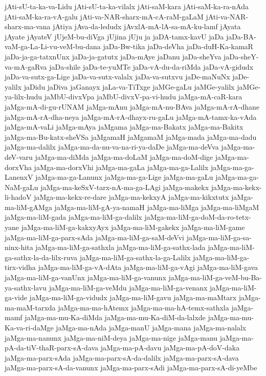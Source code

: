 {jAti-sU-ta-ka-va-Lidu
jAti-sU-ta-ka-vilalx
jAti-saM-kara
jAti-saM-ka-ra-nAda
jAti-saM-ka-ra-vA-galu
jAti-va-NAR-sharx-mA-cA-raM-gaLaM
jAti-va-NAR-sharx-ma-vana
jAtiya
jAva-da-ledudx
jAvxlA-mA-lA-sa-mA-ku-lamf
jAyata
jAyate
jAyateV
jUjeM-bu-diVga
jUjina
jUju
ja
jaDA-tamx-kavU
jaDa
jaDa-BA-vaM-ga-La-Li-vu-veM-bu-dana
jaDa-Bw-tika
jaDa-deVha
jaDa-duH-Ka-kamaR
jaDa-ja-ga-tatxnUnx
jaDa-ja-gatutx
jaDa-mAye
jaDanu
jaDa-sheYva
jaDa-sheY-va-mA-gaRva
jaDa-shile
jaDa-te-yuMTe
jaDa-vA-du-da-riMda
jaDa-vA-gidudx
jaDa-va-sutx-ga-Lige
jaDa-va-sutx-valalx
jaDa-va-sutxvu
jaDe-maNuNx
jaDe-yalilx
jaDidu
jaDiva
jaGanayx
jaLa-va-TiTxge
jaMGe-gaLu
jaMGe-yalilx
jaMGe-ya-lilx-hudu
jaMbU-divxVpa
jaMbU-divxV-pa-vi-hudu
jaMga-mA-caR-kara
jaMga-mA-di-gu-rUNAM
jaMga-mAnu
jaMga-mA-nu-BAva
jaMga-mA-rA-dhane
jaMga-mA-rA-dha-neya
jaMga-mA-rA-dhayx-ru-gaLu
jaMga-mA-tamx-ka-vAda
jaMga-mA-vaLi
jaMga-mAya
jaMgama
jaMga-ma-Bakatx
jaMga-ma-Bakitx
jaMga-ma-Bu-katx-sheVSa
jaMgamaH
jaMgamaM
jaMga-mada
jaMga-ma-dadu
jaMga-ma-dalilx
jaMga-ma-da-nu-va-na-ri-ya-daDe
jaMga-ma-deVva
jaMga-ma-deV-varu
jaMga-ma-diMda
jaMga-ma-doLaM
jaMga-ma-doM-dige
jaMga-ma-dorxVha
jaMga-ma-dorxVhi
jaMga-ma-gaLa
jaMga-ma-ga-Lalilx
jaMga-ma-ga-LanenxV
jaMga-ma-ga-Lanunx
jaMga-ma-ga-Lige
jaMga-ma-gaLu
jaMga-ma-ga-NaM-gaLu
jaMga-ma-keSxV-tarx-nA-ma-ga-LAgi
jaMga-makekx
jaMga-ma-kekx-li-hadoV
jaMga-ma-kekx-re-dare
jaMga-ma-kekxyA
jaMga-ma-kikxtutx
jaMga-ma-liM-gAMga
jaMga-ma-liM-gA-ya-namaH
jaMga-ma-liMga
jaMga-ma-liMgaM
jaMga-ma-liM-gada
jaMga-ma-liM-ga-dalilx
jaMga-ma-liM-ga-doM-da-ro-tetx-yane
jaMga-ma-liM-ga-kakxyAyx
jaMga-ma-liM-gakekx
jaMga-ma-liM-game
jaMga-ma-liM-ga-parx-sAda
jaMga-ma-liM-ga-saM-deVvi
jaMga-ma-liM-ga-sa-ninx-hita
jaMga-ma-liM-ga-sathxla
jaMga-ma-liM-ga-sathx-lada
jaMga-ma-liM-ga-sathx-la-da-lilx-ruva
jaMga-ma-liM-ga-sathx-la-ga-Lalilx
jaMga-ma-liM-ga-tirx-vidha
jaMga-ma-liM-ga-vA-dAta
jaMga-ma-liM-ga-vAgi
jaMga-ma-liM-gava
jaMga-ma-liM-ga-vanUnx
jaMga-ma-liM-ga-vanunx
jaMga-ma-liM-ga-veM-bu-Ba-ya-sathx-lavu
jaMga-ma-liM-ga-veMdu
jaMga-ma-liM-ga-venanx
jaMga-ma-liM-ga-vide
jaMga-ma-liM-ga-vidudx
jaMga-ma-liM-gavu
jaMga-ma-maMtarx
jaMga-ma-maM-tarxda
jaMga-ma-ma-hAtemx
jaMga-ma-ma-hA-temx-sathxla
jaMga-mamf
jaMga-ma-mu-Ka-diMda
jaMga-ma-mu-Ka-diM-da-lalxde
jaMga-ma-mu-Ka-va-ri-daMge
jaMga-ma-nAda
jaMga-manU
jaMga-mana
jaMga-ma-nalalx
jaMga-ma-nanunx
jaMga-ma-niM-deya
jaMga-ma-nige
jaMga-manu
jaMga-ma-pA-da-tiV-thaR-parx-sA-dava
jaMga-ma-pA-davu
jaMga-ma-pA-doV-daka
jaMga-ma-parx-sAda
jaMga-ma-parx-sA-da-dalilx
jaMga-ma-parx-sA-dava
jaMga-ma-parx-sA-da-vanunx
jaMga-ma-parx-sAdi
jaMga-ma-parx-sA-di-yeMbe
}
